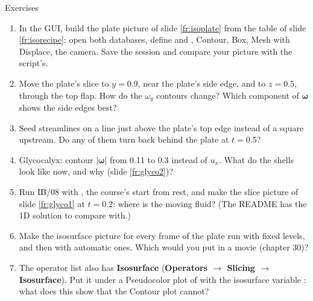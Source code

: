 \documentclass[aspectratio=169,11pt]{beamer}
\newcommand{\gui}[1]{\textsf{\textbf{#1}}}
\begin{document}
\begin{frame}{Exercises}
\label{fr:exercises}
\footnotesize
\begin{enumerate}
  \item In the GUI, build the plate picture of slide \ref{fr:isoplate} from the table of slide \ref{fr:isorecipe}: open both databases, define  and , Contour, Box, Mesh with Displace, the camera. Save the session and compare your picture with the script's.
  \item Move the plate's slice to $y = 0.9$, near the plate's side edge, and to $z = 0.5$, through the top flap. How do the $\omega_y$ contours change? Which component of $\boldsymbol\omega$ shows the side edges best?
  \item Seed streamlines on a line just above the plate's top edge instead of a square upstream. Do any of them turn back behind the plate at $t = 0.5$?
  \item Glycocalyx: contour $|\boldsymbol{\omega}|$ from 0.11 to 0.3 instead of $u_x$. What do the shells look like now, and why (slide \ref{fr:glyco2})?
  \item Run IB/08 with , the course's start from rest, and make the slice picture of slide \ref{fr:glyco1} at $t = 0.2$: where is the moving fluid? (The README has the 1D solution to compare with.)
  \item Make the isosurface picture for every frame of the plate run with fixed levels, and then with automatic ones. Which would you put in a movie (chapter 30)?
  \item The operator list also has \gui{Isosurface} (\gui{Operators $\to$ Slicing $\to$ Isosurface}). Put it under a Pseudocolor plot of  with the isosurface variable : what does this show that the Contour plot cannot?
\end{enumerate}
\end{frame}
\end{document}
